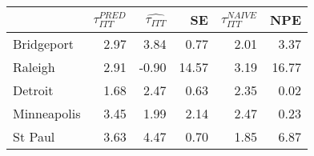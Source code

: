 
\begin{tabular}{lrrrrr}
\toprule
  & $\tau_{ITT}^{PRED}$ & $\hat{\tau_{ITT}}$ & SE & $\tau_{ITT}^{NAIVE}$ & NPE\\
\midrule
Bridgeport & 2.97 & 3.84 & 0.77 & 2.01 & 3.37\\
Raleigh & 2.91 & -0.90 & 14.57 & 3.19 & 16.77\\
Detroit & 1.68 & 2.47 & 0.63 & 2.35 & 0.02\\
Minneapolis & 3.45 & 1.99 & 2.14 & 2.47 & 0.23\\
St Paul & 3.63 & 4.47 & 0.70 & 1.85 & 6.87\\
\bottomrule
\end{tabular}